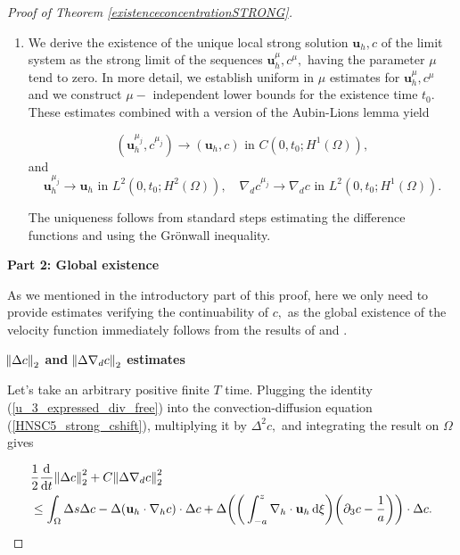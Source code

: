\documentclass[11pt]{article}
\newcommand*\diff{\mathop{}\!\mathrm{d}}
\begin{document}
\begin{proof}[Proof of Theorem \ref{existenceconcentrationSTRONG}]
\begin{enumerate}
\item We derive the existence of the unique local strong solution $\mathbf{u}_h, c$ of the limit system as the strong limit of the sequences $\mathbf{u}_h^\mu, c^\mu,$ having the parameter $\mu$ tend to zero. In more detail, we establish uniform in $\mu$ estimates for $\mathbf{u}_h^\mu, c^\mu$ and we construct $\mu-$ independent lower bounds for the existence time $t_0$. These estimates combined with a version of the Aubin-Lions lemma yield

\begin{equation}
(\mathbf{u}_h^{\mu_j}, c^{\mu_j}) \to (\mathbf{u}_h, c) \text{ in } C(0, t_0; H^1(\Omega)),
\end{equation}
%
and
%
\begin{equation}
\mathbf{u}_h^{\mu_j} \to \mathbf{u}_h \text{ in } L^2(0, t_0; H^2(\Omega)), \quad \nabla_d c^{\mu_j} \to \nabla_d c \text{ in } L^2(0, t_0; H^1(\Omega)).
\end{equation}

The uniqueness follows from standard steps estimating the difference functions and using the Gr\"onwall inequality.

\end{enumerate}

\bigskip

\textbf{Part 2: Global existence}

As we mentioned in the introductory part of this proof, here we only need to provide estimates verifying the continuability of $c,$ as the global existence of the velocity function immediately follows from the results of \cite{li2019primitive} and \cite{petcu2005sobolev}.

\bigskip

\textbf{$\norm{\Delta c}_2$ and $\norm{\Delta \nabla_d c}_2$ estimates}

Let's take an arbitrary positive finite $T$ time. Plugging the identity (\ref{u_3_expressed_div_free}) into the convection-diffusion equation (\ref{HNSC5_strong_cshift}), multiplying it by $\Delta^2 c,$ and integrating the result on $\Omega$ gives

\begin{equation} \label{firstformboundc}
\begin{split}
& \frac{1}{2} \frac{\diff}{\diff t} \norm{\Delta c}_2^2 + C \norm{\Delta \nabla_d c}_2^2 \\
& \leq \int_\Omega \Delta s \Delta c - \Delta ( \mathbf{u}_h \cdot \nabla_h c) \cdot \Delta c + \Delta \bigg ( \bigg ( \int_{-a}^z \nabla_h \cdot \mathbf{u}_h \diff \xi \bigg) \bigg ( \partial_3 c - \frac{1}{a} \bigg) \bigg ) \cdot \Delta c.
\end{split}
\end{equation}


\end{proof}
\end{document}
